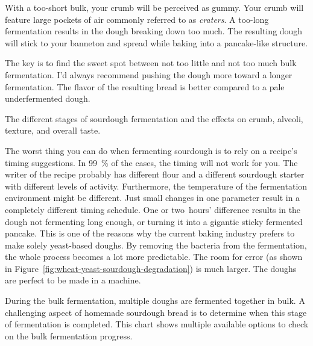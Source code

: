 With a too-short bulk, your crumb will be
perceived as gummy. Your crumb will feature large pockets of
air commonly referred to as \emph{craters}. A too-long fermentation
results in the dough breaking down too much. The resulting
dough will stick to your banneton and spread while baking
into a pancake-like structure.

The key is to find the sweet spot between not too little
and not too much bulk fermentation. I'd always recommend pushing
the dough more toward a longer fermentation. The
flavor of the resulting bread is better compared to a pale
underfermented dough.

\begin{table}[!htb]
    \centering
        
        \caption[Stages of sourdough fermentation]{The different stages of
            sourdough fermentation and the effects on crumb, alveoli, texture,
            and overall taste.}
\end{table}

The worst thing you can do when fermenting sourdough
is to rely on a recipe's timing suggestions. In \qty{99}{\percent}
of the cases, the timing will not work for you. The writer
of the recipe probably has different flour and a different
sourdough starter with different levels of activity. Furthermore,
the temperature of the fermentation environment might be
different. Just small changes in one parameter result
in a completely different timing schedule. One or two~hours'
difference results in the dough not fermenting long enough, or
turning it into a gigantic sticky fermented pancake. This
is one of the reasons why the current baking industry prefers
to make solely yeast-based doughs. By removing the bacteria
from the fermentation, the whole process becomes a lot more
predictable. The room for error (as shown in
Figure~\ref{fig:wheat-yeast-sourdough-degradation}) is much larger. The doughs
are perfect to be made in a machine.

\begin{flowchart}[!htb]
  \centering
  
  \caption[Process to check the bulk fermentation]{During the bulk
      fermentation, multiple doughs are fermented together in bulk.  A
      challenging aspect of homemade sourdough bread is to determine when this
      stage of fermentation is completed. This chart shows multiple available
      options to check on the bulk fermentation progress.}%
  \label{fig:bulk-fermentation}
\end{flowchart}

